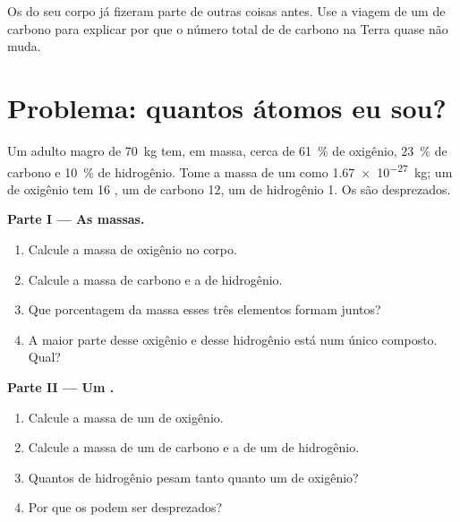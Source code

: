 \begin{exercise}[$\star\star\star$]\label{exo:g9:elements-universe-earth:12}
Os  do seu corpo já fizeram parte de outras coisas antes. Use a
viagem de um  de carbono para explicar por que o número total de
 de carbono na Terra quase não muda.
\end{exercise}

\section{Problema: quantos átomos eu sou?}

\begin{problem}
\label{pb:g9:elements-universe-earth:1}
Um adulto magro de \qty{70}{kg} tem, em massa, cerca de
\qty{61}{\percent} de oxigênio, \qty{23}{\percent} de carbono e
\qty{10}{\percent} de hidrogênio. Tome a massa de um  como
\qty{1.67e-27}{kg}; um  de oxigênio tem 16 , um  de
carbono 12, um  de hidrogênio 1. Os  são desprezados.

\medskip
\noindent\textbf{Parte I --- As massas.}
\begin{enumerate}
  \item Calcule a massa de oxigênio no corpo.
  \item Calcule a massa de carbono e a de hidrogênio.
  \item Que porcentagem da massa esses três elementos formam juntos?
  \item A maior parte desse oxigênio e desse hidrogênio está num único
        composto. Qual?
\end{enumerate}

\medskip
\noindent\textbf{Parte II --- Um .}
\begin{enumerate}[resume]
  \item Calcule a massa de um  de oxigênio.
  \item Calcule a massa de um  de carbono e a de um  de
        hidrogênio.
  \item Quantos  de hidrogênio pesam tanto quanto um  de
        oxigênio?
  \item Por que os  podem ser desprezados?
\end{enumerate}


\end{problem}
